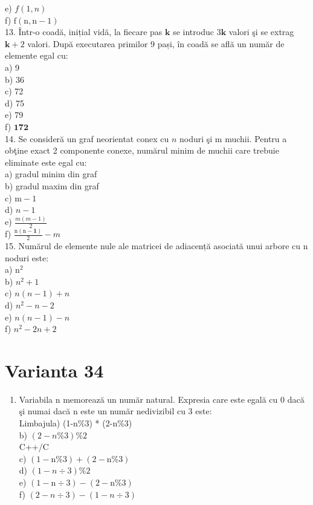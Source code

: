 e) $f(1, n)$\\
f) $\mathrm{f}(\mathrm{n}, \mathrm{n}-1)$\\
13. Într-o coadă, inițial vidă, la fiecare pas $\mathbf{k}$ se introduc $3 \mathbf{k}$ valori şi se extrag $\mathbf{k}+2$ valori. După executarea primilor 9 pași, în coadă se află un număr de elemente egal cu:\\
a) 9\\
b) 36\\
c) 72\\
d) 75\\
e) 79\\
f) $\mathbf{1 7 2}$\\
14. Se consideră un graf neorientat conex cu $n$ noduri şi m muchii. Pentru a obţine exact 2 componente conexe, numărul minim de muchii care trebuie eliminate este egal cu:\\
a) gradul minim din graf\\
b) gradul maxim din graf\\
c) $\mathrm{m}-1$\\
d) $n-1$\\
e) $\frac{m(m-1)}{2}$\\
f) $\frac{\mathrm{n}(\mathrm{n}-\mathbf{1})}{2}-m$\\
15. Numărul de elemente nule ale matricei de adiacență asociată unui arbore cu n noduri este:\\
a) $\mathrm{n}^{2}$\\
b) $n^{2}+1$\\
c) $n(n-1)+n$\\
d) $n^{2}-n-2$\\
e) $n(n-1)-n$\\
f) $n^{2}-2 n+2$

\section*{Varianta 34}
\begin{enumerate}
  \item Variabila n memorează un număr natural. Expresia care este egală cu 0 dacă şi numai dacă n este un număr nedivizibil cu 3 este:\\
Limbajula) (1-n\%3) * (2-n\%3)\\
b) $(2-n \% 3) \% 2$\\
C++/C\\
c) $(1-\mathrm{n} \% 3)+(2-\mathrm{n} \% 3)$\\
d) $(1-n \div 3) \% 2$\\
e) $(1-\mathrm{n} \div 3)-(2-\mathrm{n} \% 3)$\\
f) $(2-n \div 3)-(1-n \div 3)$
\end{enumerate}

